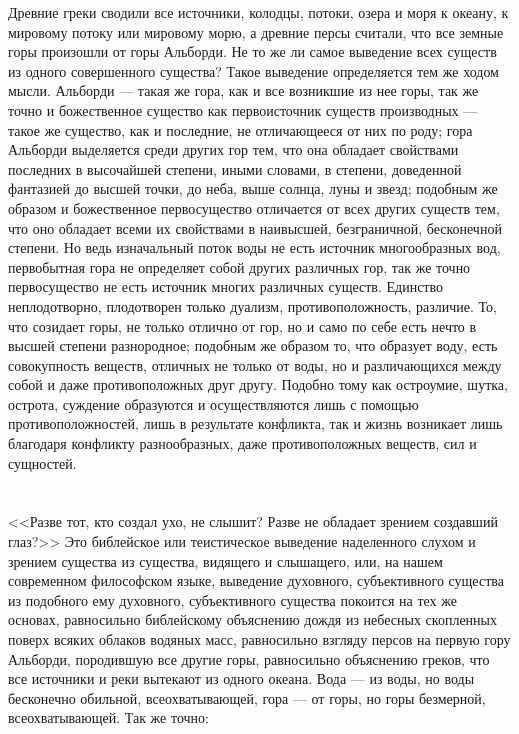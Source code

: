 \documentclass[12pt]{article}
\begin{document}
Древние греки сводили все источники, колодцы, потоки, озера и моря к океану, к мировому потоку или мировому морю, а древние персы считали, что все земные горы произошли от горы Альборди. Не то же ли самое выведение всех существ из одного совершенного существа? Такое выведение определяется тем же ходом мысли. Альборди --- такая же гора, как и все возникшие из нее горы, так же точно и божественное существо как первоисточник существ производных --- такое же существо, как и последние, не отличающееся от них по роду; гора Альборди выделяется среди других гор тем, что она обладает свойствами последних в высочайшей степени, иными словами, в степени, доведенной фантазией до высшей точки, до неба, выше солнца, луны и звезд; подобным же образом и божественное первосущество отличается от всех других существ тем, что оно обладает всеми их свойствами в наивысшей, безграничной, бесконечной степени. Но ведь изначальный поток воды не есть источник многообразных вод, первобытная гора не определяет собой других различных гор, так же точно первосущество не есть источник многих различных существ. Единство неплодотворно, плодотворен только дуализм, противоположность, различие. То, что созидает горы, не только отлично от гор, но и само по себе есть нечто в высшей степени разнородное; подобным же образом то, что образует воду, есть совокупность веществ, отличных не только от воды, но и различающихся между собой и даже противоположных друг другу. Подобно тому как остроумие, шутка, острота, суждение образуются и осуществляются лишь с помощью противоположностей, лишь в результате конфликта, так и жизнь возникает лишь благодаря конфликту разнообразных, даже противоположных веществ, сил и сущностей.



\section{}

<<Разве тот, кто создал ухо, не слышит? Разве не обладает зрением создавший глаз?>> Это библейское или теистическое выведение наделенного слухом и зрением существа из существа, видящего и слышащего, или, на нашем современном философском языке, выведение духовного, субъективного существа из подобного ему духовного, субъективного существа покоится на тех же основах, равносильно библейскому объяснению дождя из небесных скопленных поверх всяких облаков водяных масс, равносильно взгляду персов на первую гору Альборди, породившую все другие горы, равносильно объяснению греков, что все источники и реки вытекают из одного океана. Вода --- из воды, но воды бесконечно обильной, всеохватывающей, гора --- от горы, но горы безмерной, всеохватывающей. Так же точно:
\end{document}
